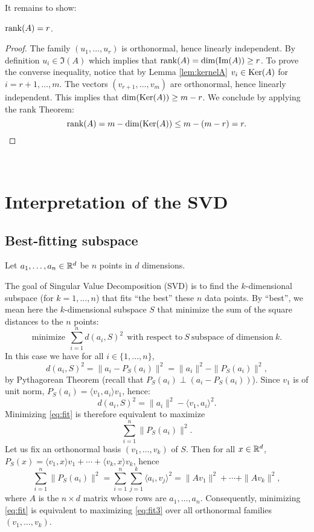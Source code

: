 \documentclass[11pt,nocut]{article}
\begin{document}
It remains to show:
\begin{lemma}
	${{\rm rank}}(A) = r$.
\end{lemma}
\begin{proof}
	The family $(u_1, \dots, u_r)$ is orthonormal, hence linearly independent. By definition $u_i \in \Im(A)$ which implies that ${{\rm rank}}(A) = {{\rm dim}}({{\rm Im}}(A)) \geq r$.
	To prove the converse inequality, notice that by Lemma \ref{lem:kernelA} $v_i \in {{\rm Ker}}(A)$ for $i=r+1, \dots, m$.
	The vectors $(v_{r+1}, \dots, v_m)$ are orthonormal, hence linearly independent. This implies that ${{\rm dim}}({{\rm Ker}}(A)) \geq m-r$. We conclude by applying the rank Theorem:
	$$
	{{\rm rank}}(A) = m - {{\rm dim}}({{\rm Ker}}(A)) \leq m - (m-r) = r.
	$$
\end{proof}
\\

\section{Interpretation of the SVD}
\subsection{Best-fitting subspace}
Let $a_1, \dots, a_n \in \mathbb{R}^d$ be $n$ points in $d$ dimensions.

The goal of Singular Value Decomposition (SVD) is to find the $k$-dimensional subspace (for $k = 1, \dots, n$) that fits ``the best'' these $n$ data points. By ``best'', we mean here the $k$-dimensional subspace $S$ that minimize the sum of the square distances to the $n$ points:
\begin{equation}\label{eq:fit}
	\text{minimize} \ \ \sum_{i=1}^n d(a_i, S)^2 \ \ \text{with respect to} \ S \ \text{subspace of dimension} \ k.
\end{equation}
In this case we have for all $i \in \{1, \dots, n\}$,
$$
d(a_i, S)^2 = \| a_i - P_{S}(a_i) \|^2 = \|a_i\|^2 - \| P_{S}(a_i) \|^2,
$$
by Pythagorean Theorem (recall that $P_{S}(a_i) \perp (a_i - P_S(a_i))$). Since $v_1$ is of unit norm, $P_{S}(a_i) = \langle v_1, a_i \rangle v_1$, hence:
$$
d(a_i, S)^2 =  \|a_i\|^2 - \langle v_1, a_i \rangle^2.
$$
Minimizing \eqref{eq:fit} is therefore equivalent to maximize
\begin{equation}\label{eq:fit2}
	\sum_{i=1}^n \| P_{S}(a_i) \|^2.
\end{equation}
Let us fix an orthonormal basis $(v_1, \dots, v_k)$ of $S$. Then for all $x \in \mathbb{R}^d$,
$P_S(x)= \langle v_1, x \rangle v_1 + \cdots + \langle v_k, x \rangle v_k$, hence
\begin{equation}\label{eq:fit3}
	\sum_{i=1}^n \| P_{S}(a_i) \|^2 = \sum_{i=1}^n \sum_{j = 1}^k \langle a_i, v_j \rangle^2
	= \| A v_1 \|^2 + \cdots + \| A v_k \|^2,
\end{equation}
where $A$ is the $n \times d$ matrix whose rows are $a_1, \dots, a_n$.
Consequently, minimizing \eqref{eq:fit} is equivalent to maximizing \eqref{eq:fit3} over all orthonormal families $(v_1, \dots, v_k)$.
\\
\end{document}
